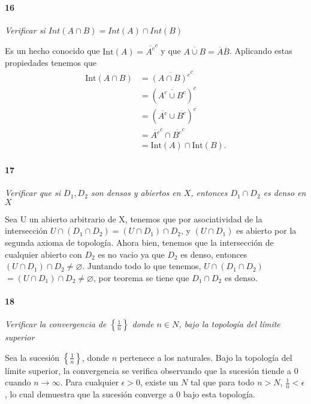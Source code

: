 \documentclass[12pt]{article}
\begin{document}
\paragraph{16}
\textit{Verificar si $Int(A\cap B)=Int(A)\cap Int(B)$}

Es un hecho conocido que $\text{Int}(A)=\overline{A^c}^c$ y que $\overline{A \cup B}=\overline{A} \overline{B}$. Aplicando estas propiedades tenemos que 
\begin{align*}
    \text{Int}(A \cap B) &=\overline{(A \cap B)^c}^c \\
                         &=(\overline{A^c \cup B^c})^c \\
                         &=(\overline{A^c} \cup \overline{B^c})^c \\
                         &=\overline{A^c}^c \cap \overline{B^c}^c \\
                         &=\text{Int}(A) \cap \text{Int}(B).
\end{align*}


\paragraph{17}
\textit{Verificar que si $D_{1}, D_{2}$ son densos y abiertos en $X$, entonces $D_{1} \cap D_{2}$ es denso en $X$}

Sea U un abierto arbitrario de X, tenemos que por
asociatividad de la intersecci\'on
$U \cap (D_{1} \cap D_{2}) = (U \cap D_{1}) \cap D_{2}$,
y $(U \cap D_{1})$ es abierto por la segunda axioma de
topolog\'ia. Ahora bien, tenemos que la intersecci\'on de
cualquier abierto con $D_{2}$ es no vacio ya que $D_{2}$ es
denso, entonces $(U \cap D_{1}) \cap D_{2} \neq \varnothing$.
Juntando todo lo que tenemos, $U \cap (D_{1} \cap D_{2})$
$= (U \cap D_{1}) \cap D_{2} \neq \varnothing$, por teorema
se tiene que $D_{1} \cap D_{2}$ es denso.

\paragraph{18}
\textit{Verificar la convergencia de $\left\{\frac{1}{n}\right\}$ donde $n \in N $, bajo la topolog\'ia del l\'imite superior }

Sea la sucesi\'on \(\left\{\frac{1}{n}\right\}\), donde \(n\) pertenece a los naturales. Bajo la topolog\'ia del l\'imite superior, la convergencia se verifica observando que la sucesi\'on tiende a 0 cuando \(n \to \infty\). Para cualquier \(\epsilon > 0\), existe un \(N\) tal que para todo \(n > N\), \(\frac{1}{n} < \epsilon\), lo cual demuestra que la sucesión converge a 0 bajo esta topolog\'ia. 
\end{document}
